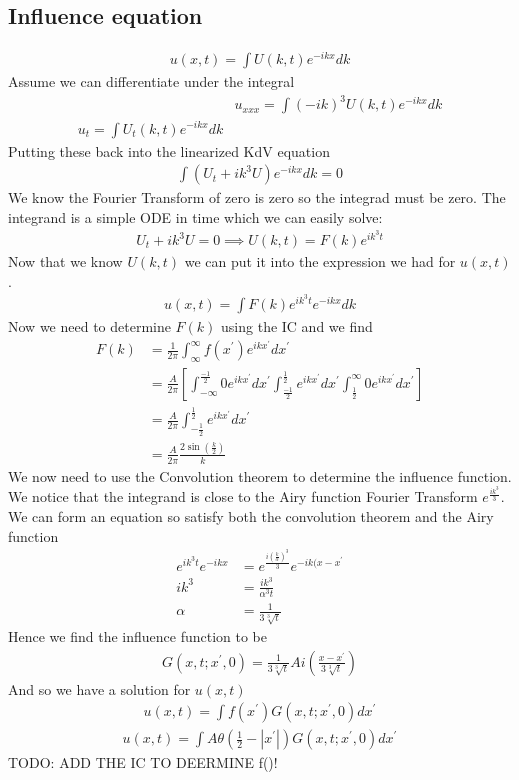 \documentclass{article}
\begin{document}
\subsection{Influence equation}
\begin{align*}
u(x,t) = \int U(k,t)e^{-ikx}dk
\end{align*}
Assume we can differentiate under the integral
\begin{align*}
&u_{xxx} = \int (-ik)^3U(k,t)e^{-ikx}dk \\
u_t = \int U_t(k,t)e^{-ikx}dk
\end{align*}
Putting these back into the linearized KdV equation
\begin{align*}
\int (U_t + ik^3 U) e^{-ikx}dk = 0
\end{align*}
We know the Fourier Transform of zero is zero so the integrad must be zero. The integrand is a simple ODE in time which we can easily solve:
\begin{align*}
U_t + ik^3U = 0 \implies U(k,t) = F(k)e^{ik^3t}
\end{align*}
Now that we know $U(k,t)$ we can put it into the expression we had for $u(x,t)$.
\begin{align*}
u(x,t) = \int F(k) e^{ik^3t}e^{-ikx}dk
\end{align*} 
Now we need to determine $F(k)$ using the IC and we find
\begin{align*}
F(k) &= \frac{1}{2\pi} \int_{\infty}^{\infty} f(x^\prime) e^{ikx^\prime}dx^\prime \\
&= \frac{A}{2\pi} \left[ \int_{-\infty}^\frac{-1}{2} 0e^{ikx^\prime}dx^\prime        \int_\frac{-1}{2}^\frac{1}{2}e^{ikx^\prime}dx^\prime \int^{\infty}_\frac{1}{2} 0e^{ikx^\prime}dx^\prime\right] \\
&= \frac{A}{2\pi}\int_{-\frac{1}{2}}^\frac{1}{2}e^{ikx^\prime}dx^\prime \\
&= \frac{A}{2\pi}\frac{2\sin(\frac{k}{2})}{k}
\end{align*}
We now need to use the Convolution theorem to determine the influence function. We notice that the integrand is close to the Airy function Fourier Transform $e^{\frac{ik^3}{3}}$. We can form an equation so satisfy both the convolution theorem and the Airy function
\begin{align*}
e^{ik^3t}e^{-ikx} &= e^{\frac{i(\frac{k}{\alpha})^3}{3}}e^{-ik(x-x^\prime} \\
ik^3 &= \frac{ik^3}{\alpha^3 t} \\
\alpha &= \frac{1}{3\sqrt[3]{t}}
\end{align*}
Hence we find the influence function to be
\begin{align*}
G(x,t;x^\prime, 0) = \frac{1}{3\sqrt[3]{t}}Ai\left(\frac{x-x^\prime}{3\sqrt[3]{t}}\right)
\end{align*}
And so we have a solution for $u(x,t)$
\begin{align*}
u(x,t) = \int f(x^\prime)G(x,t;x^\prime, 0) dx^\prime
\end{align*}
\begin{align*}
u(x,t) = \int A \theta(\frac{1}{2}- |x^\prime|) G(x,t;x^\prime, 0) dx^\prime
\end{align*}
TODO: ADD THE IC TO DEERMINE f()!
\end{document}
